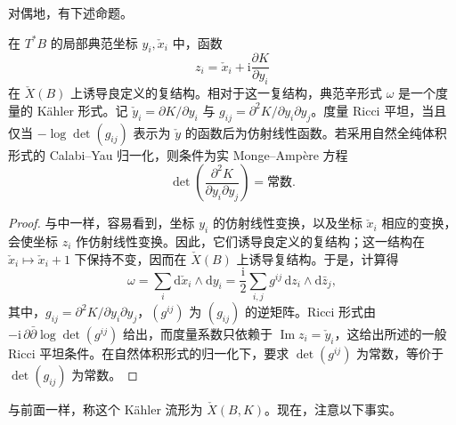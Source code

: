对偶地，有下述命题。

\begin{proposition}\label{prop:6.15}
在 $T^*B$ 的局部典范坐标 $y_i,\check x_i$ 中，函数
\[
z_i=\check x_i+\mathrm i\frac{\partial K}{\partial y_i}
\]
在 $\check X(B)$ 上诱导良定义的复结构。相对于这一复结构，典范辛形式 $\omega$ 是一个度量的 Kähler 形式。记 $\check y_i=\partial K/\partial y_i$ 与 $g_{ij}=\partial^2K/\partial y_i\partial y_j$。度量 Ricci 平坦，当且仅当 $-\log\det(g_{ij})$ 表示为 $\check y$ 的函数后为仿射线性函数。若采用自然全纯体积形式的 Calabi--Yau 归一化，则条件为实 Monge--Ampère 方程
\[
\det\!\left(\frac{\partial^2K}{\partial y_i\partial y_j}\right)=\text{常数}.
\]
\end{proposition}
\begin{proof}
与中一样，容易看到，坐标 $y_i$ 的仿射线性变换，以及坐标 $\check x_i$ 相应的变换，会使坐标 $z_i$ 作仿射线性变换。因此，它们诱导良定义的复结构；这一结构在 $\check x_i\mapsto\check x_i+1$ 下保持不变，因而在 $\check X(B)$ 上诱导复结构。于是，计算得
\[
\omega=\sum_i\mathrm d\check x_i\wedge\mathrm dy_i
=\frac{\mathrm i}{2}\sum_{i,j}g^{ij}\,\mathrm dz_i\wedge\mathrm d\bar z_j,
\]
其中，$g_{ij}=\partial^2K/\partial y_i\partial y_j$，$(g^{ij})$ 为 $(g_{ij})$ 的逆矩阵。Ricci 形式由 $-\mathrm i\,\partial\bar\partial\log\det(g^{ij})$ 给出，而度量系数只依赖于 $\operatorname{Im}z_i=\check y_i$，这给出所述的一般 Ricci 平坦条件。在自然体积形式的归一化下，要求 $\det(g^{ij})$ 为常数，等价于 $\det(g_{ij})$ 为常数。
\end{proof}

与前面一样，称这个 Kähler 流形为 $\check X(B,K)$。现在，注意以下事实。

